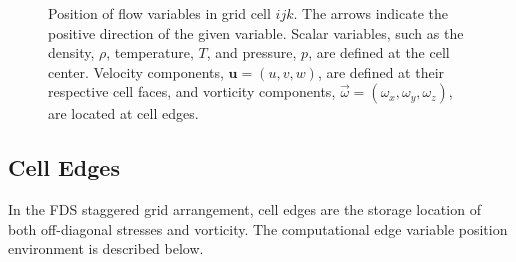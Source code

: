 \begin{figure}[!h]
\caption[Position of flow variables in a grid cell]{Position of flow variables in grid cell $ijk$. The arrows indicate the positive direction of the given variable. Scalar variables, such as the density, $\rho$, temperature, $T$, and pressure, $p$, are defined at the cell center. Velocity components, $\mathbf{u}=(u,v,w)$, are defined at their respective cell faces, and vorticity components, $\vec{\omega}=(\omega_x,\omega_y,\omega_z)$, are located at cell edges.}
\label{variable_positions}
\end{figure}

\subsection{Cell Edges}
\label{sec:cell_edges}

In the FDS staggered grid arrangement, cell edges are the storage location of both off-diagonal stresses and vorticity.  The computational edge variable position environment is described below.

